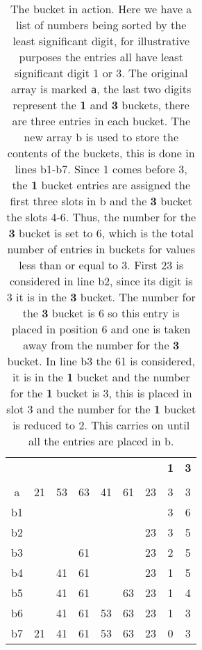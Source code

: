 \documentclass[11pt,a4paper]{scrartcl}
\begin{document}
\begin{table}
\begin{tabular}{c|cccccc|c|c}
 &  &  &  &  &  &  &{\bf 1}&{\bf 3}\\
 &  &  &  &  &  &  &&\\
a&21&53&63&41&61&23&3&3\\
\hline
b1&  &  &  &  &  & &3&6\\
b2&  &  &  &  &  &23&3&5\\
b3&  &  &61&  &  &23&2&5\\
b4&  &41&61&  &  &23&1&5\\
b5&  &41&61&  &63&23&1&4\\
b6&  &41&61&53&63&23&1&3\\
b7&21&41&61&53&63&23&0&3
\end{tabular}
\caption{The bucket in action. Here we have a list of numbers being
  sorted by the least significant digit, for illustrative purposes the
  entries all have least significant digit 1 or 3. The original array
  is marked \texttt{a}, the last two digits represent the {\bf 1} and
  {\bf 3} buckets, there are three entries in each bucket. The new
  array b is used to store the contents of the buckets, this is done
  in lines b1-b7. Since 1 comes before 3, the {\bf 1} bucket entries
  are assigned the first three slots in b and the {\bf 3} bucket the
  slots 4-6. Thus, the number for the {\bf 3} bucket is set to 6,
  which is the total number of entries in buckets for values less than
  or equal to 3. First 23 is considered in line b2, since its digit is
  3 it is in the {\bf 3} bucket. The number for the {\bf 3} bucket is
  6 so this entry is placed in position 6 and one is taken away from
  the number for the {\bf 3} bucket. In line b3 the 61 is considered,
  it is in the {\bf 1} bucket and the number for the {\bf 1} bucket is
  3, this is placed in slot 3 and the number for the {\bf 1} bucket is
  reduced to 2. This carries on until all the entries are placed in
  b. \label{table_buckets}}
\end{table}
\end{document}
